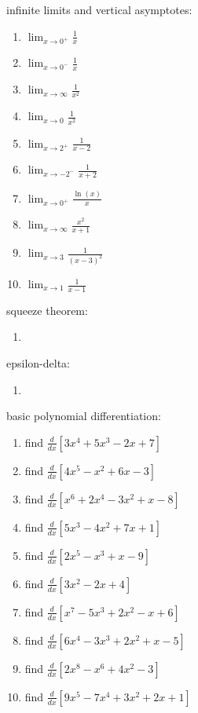 \documentclass{article}
\begin{document}
infinite limits and vertical asymptotes:
\begin{enumerate}
        \item $\lim_{x \to 0^+} \frac{1}{x}$
        \item $\lim_{x \to 0^-} \frac{1}{x}$
        \item $\lim_{x \to \infty} \frac{1}{x^2}$
        \item $\lim_{x \to 0} \frac{1}{x^2}$
        \item $\lim_{x \to 2^+} \frac{1}{x-2}$
        \item $\lim_{x \to -2^-} \frac{1}{x+2}$
        \item $\lim_{x \to 0^+} \frac{\ln(x)}{x}$
        \item $\lim_{x \to \infty} \frac{x^2}{x+1}$
        \item $\lim_{x \to 3} \frac{1}{(x-3)^2}$
        \item $\lim_{x \to 1} \frac{1}{x-1}$
\end{enumerate}

squeeze theorem:
\begin{enumerate}
	\item
\end{enumerate}

epsilon-delta:
\begin{enumerate}
	\item
\end{enumerate}

basic polynomial differentiation:
\begin{enumerate}
	\item find $\frac{d}{dx}[3x^4 + 5x^3 - 2x + 7]$
	\item find $\frac{d}{dx}[4x^5 - x^2 + 6x - 3]$
	\item find $\frac{d}{dx}[x^6 + 2x^4 - 3x^2 + x - 8]$
	\item find $\frac{d}{dx}[5x^3 - 4x^2 + 7x + 1]$
	\item find $\frac{d}{dx}[2x^5 - x^3 + x - 9]$
	\item find $\frac{d}{dx}[3x^2 - 2x + 4]$
	\item find $\frac{d}{dx}[x^7 - 5x^3 + 2x^2 - x + 6]$
	\item find $\frac{d}{dx}[6x^4 - 3x^3 + 2x^2 + x - 5]$
	\item find $\frac{d}{dx}[2x^8 - x^6 + 4x^2 - 3]$
	\item find $\frac{d}{dx}[9x^5 - 7x^4 + 3x^2 + 2x + 1]$
\end{enumerate}
\end{document}
